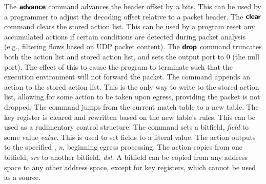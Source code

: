 The $\bm{\mathsf{{advance}}}$ command advances the header offset by \textit{n} bits.
This can be used by a programmer to adjust the decoding offset relative to a
packet header.
The $\bm{\mathsf{{clear}}}$ command clears the stored action list. This can be used
by a program reset any accumulated actions if certain conditions are detected
during packet analysis (e.g., filtering flows based on UDP packet content).
The $\bm{\mathsf{{drop}}}$ command truncates both the action list and stored action list,
and sets the output port to 0 (the null port). 
The effect of this to cause the program to terminate such that the execution 
environment will not forward the packet.
The  command appends an action to the stored action list. This is
the only way to write to the stored action list, allowing for some action to be
taken upon egress, providing the packet is not dropped.
The  command jumps from the current match table to a new table. The
key register is cleared and rewritten based on the new table's rules. This can
be used as a rudimentary control structure.
The  command sets a bitfield, \textit{field} to some value \textit{value}.
This is used to set fields to a literal value.
The  action outputs to the specified , \textit{n}, beginning
egress processing.
The  action copies from one bitfield, \textit{src} to another bitfield, \textit{dst}.
A bitfield can be copied from any address space to any other address space, except for key registers,
which cannot be used as a source.

